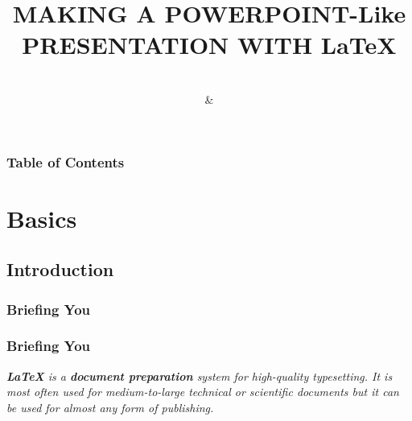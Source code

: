 \documentclass{beamer}
\begin{document}


\title{MAKING A POWERPOINT-Like PRESENTATION WITH \LaTeX}
\author{{}  \\ \color{brown}\& \\  {}}

        \begin{frame}
        \transblindshorizontal
            \titlepage
        \end{frame}

        
        \begin{frame}[shrink]
        \frametitle{Table of Contents}
        \transblindsvertical
                \tableofcontents{}
        \end{frame}

        
        \section{Basics}

            \subsection{Introduction}

            \subsubsection{Briefing You}
            \begin{frame}
            \frametitle{Briefing You}
            \transboxin

                \textsl{\textbf{\LaTeX} is a \textbf{document preparation} system for high-quality typesetting. It is most often used for medium-to-large technical or scientific documents but it can be used for almost any form of publishing.}
            \end{frame}
            
\end{document}

